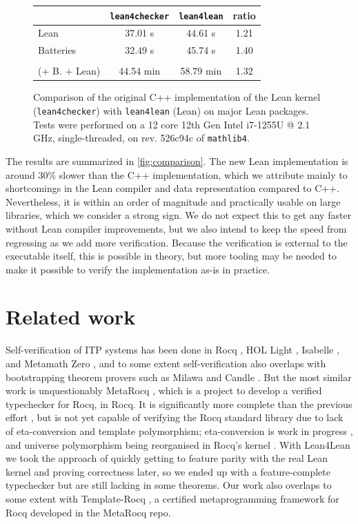 \documentclass[sigplan,10pt,screen]{acmart}\settopmatter{printfolios=true,printccs=false,printacmref=false}
\newcommand{\lfl}{\textsf{Lean4Lean}\xspace}
\begin{document}
\begin{figure}[tb]
  \centering
  \begin{tabular}{l|c|c|c}
    & \texttt{lean4checker} & \texttt{lean4lean} & ratio \\ \hline
    \textsf{Lean} & 37.01 s & 44.61 s & 1.21 \\
    \textsf{Batteries} & 32.49 s & 45.74 s & 1.40 \\
    \makecell[lc]{\textsf{Mathlib} \\ (+ \textsf{B.} + \textsf{Lean})} & 44.54 min & 58.79 min & 1.32 \\
  \end{tabular}
  \caption{Comparison of the original C++ implementation of the Lean kernel (\texttt{lean4checker}) with \texttt{lean4lean} (Lean) on major Lean packages. Tests were performed on a 12 core 12th Gen Intel i7-1255U @ 2.1 GHz, single-threaded, on rev. 526c94c of \texttt{mathlib4}.}
  \label{fig:comparison}
\end{figure}

The results are summarized in \autoref{fig:comparison}. The new Lean implementation is around 30\% slower than the C++ implementation, which we attribute mainly to shortcomings in the Lean compiler and data representation compared to C++. Nevertheless, it is within an order of magnitude and practically usable on large libraries, which we consider a strong sign.
We do not expect this to get any faster without Lean compiler improvements, but we also intend to keep the speed from regressing as we add more verification. Because the verification is external to the executable itself, this is possible in theory, but more tooling may be needed to make it possible to verify the implementation as-is in practice.

\section{Related work}\label{sec:related-work}

Self-verification of ITP systems has been done in Rocq \cite{coqincoq}, HOL Light \cite{harrison-holhol}, Isabelle \cite{nipkow21}, and Metamath Zero \cite{mm0-paper}, and to some extent self-verification also overlaps with bootstrapping theorem provers such as Milawa \cite{davis09} and Candle \cite{candle,Kumar14}. But the most similar work is unquestionably MetaRocq \cite{sozeau20,coqcoqcorrect,sozeau23}, which is a project to develop a verified typechecker for Rocq, in Rocq. It is significantly more complete than the previous effort \cite{coqincoq}, but is not yet capable of verifying the Rocq standard library due to lack of eta-conversion and template polymorphism; eta-conversion is work in progress \cite{lennon-bertrand2022}, and universe polymorphism being reorganised in Rocq's kernel \cite{poiret2025}. With \lfl we took the approach of quickly getting to feature parity with the real Lean kernel and proving correctness later, so we ended up with a feature-complete typechecker but are still lacking in some theorems. Our work also overlaps to some extent with Template-Rocq \cite{anand18,boulierphd,winterhalterphd}, a certified metaprogramming framework for Rocq developed in the MetaRocq repo.
\end{document}
